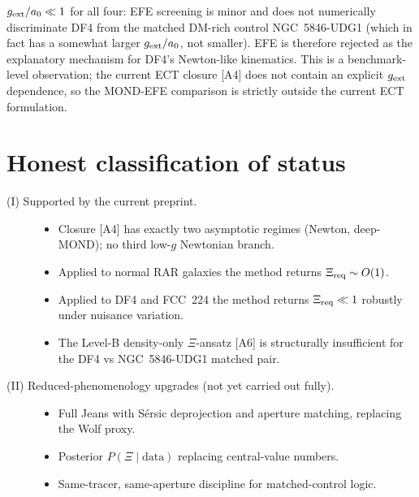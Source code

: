 \documentclass[11pt]{article}
\begin{document}
$g_{\rm ext}/a_0\ll 1$ for all four: EFE screening is minor and does
not numerically discriminate DF4 from the matched DM-rich control
NGC~5846-UDG1 (which in fact has a somewhat larger $g_{\rm ext}/a_0$,
not smaller). EFE is therefore rejected as the explanatory mechanism
for DF4's Newton-like kinematics. This is a benchmark-level
observation; the current ECT closure [A4] does not contain an explicit
$g_{\rm ext}$ dependence, so the MOND-EFE comparison is strictly
outside the current ECT formulation.

\section{Honest classification of status}

\begin{description}
\item[(I) Supported by the current preprint.]
\begin{itemize}
\item Closure [A4] has exactly two asymptotic regimes (Newton,
deep-MOND); no third low-$g$ Newtonian branch.
\item Applied to normal RAR galaxies the method returns
$\Xi_{\rm req}\sim O(1)$.
\item Applied to DF4 and FCC~224 the method returns
$\Xi_{\rm req}\ll 1$ robustly under nuisance variation.
\item The Level-B density-only $\Xi$-ansatz [A6] is structurally
insufficient for the DF4 vs NGC~5846-UDG1 matched pair.
\end{itemize}

\item[(II) Reduced-phenomenology upgrades (not yet carried out fully).]
\begin{itemize}
\item Full Jeans with S\'ersic deprojection and aperture matching,
replacing the Wolf proxy.
\item Posterior $P(\Xi\mid\text{data})$ replacing central-value numbers.
\item Same-tracer, same-aperture discipline for matched-control logic.
\end{itemize}


\end{description}
\end{document}
